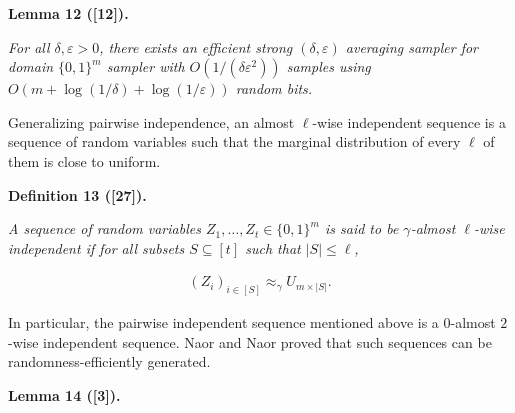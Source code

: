 \documentclass[10pt,a4paper]{article}
\begin{document}


\par\medskip\noindent\textbf{
\textbf{Lemma 12}\textbf{ }([12])\textbf{.}
}\par



\emph{For all $\delta,\varepsilon>0$, there exists an efficient strong $(\delta,\varepsilon)$ averaging sampler for domain $\{0,1\}^{m}$ sampler with $O(1/(\delta\varepsilon^{2}))$ samples using $O(m+\log(1/\delta)+\log(1/\varepsilon))$ random bits.}\par






Generalizing pairwise independence, an almost $\ell$-wise independent sequence is a sequence of random variables such that the marginal distribution of every $\ell$ of them is close to uniform.\par





\par\medskip\noindent\textbf{
\textbf{Definition 13}\textbf{ }([27])\textbf{.}
}\par



\emph{A sequence of random variables $Z_{1},\dots,Z_{t}\in\{0,1\}^{m}$ is said to be $\gamma$-almost $\ell$-wise independent if for all subsets $S\subseteq[t]$ such that $|S|\leq\ell$,}\par


\[\begin{gathered}
(Z_{i})_{i\in[S]}\approx_{\gamma}U_{m\times|S|}.
\end{gathered}\]






In particular, the pairwise independent sequence mentioned above is a $0$-almost $2$-wise independent sequence. Naor and Naor proved that such sequences can be randomness-efficiently generated.\par





\par\medskip\noindent\textbf{
\textbf{Lemma 14}\textbf{ }([3])\textbf{.}
}\par
\end{document}
